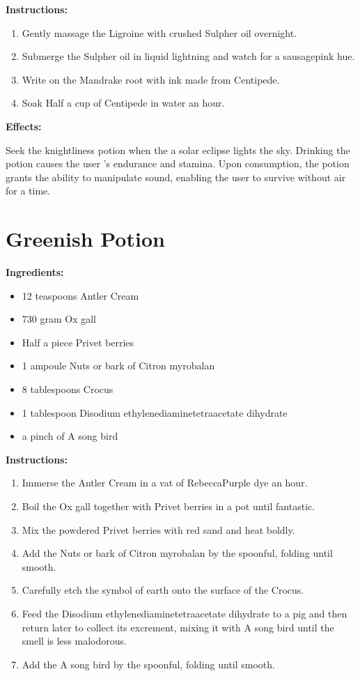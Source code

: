 \documentclass{article}
\begin{document}
\textbf{Instructions:}

\begin{enumerate}
  \item Gently massage the Ligroine with crushed Sulpher oil overnight.
  \item Submerge the Sulpher oil in liquid lightning and watch for a sausagepink hue.
  \item Write on the Mandrake root with ink made from Centipede.
  \item Soak Half a cup of Centipede in water an hour.
\end{enumerate}

\textbf{Effects:}

Seek the knightliness potion when the a solar eclipse lights the sky. Drinking the potion causes the user 's endurance and stamina. Upon consumption, the potion grants the ability to manipulate sound, enabling the user to survive without air for a time.

\newpage
\section*{Greenish Potion}

\textbf{Ingredients:}

\begin{itemize}
  \item 12 teaspoons Antler Cream
  \item 730 gram Ox gall
  \item Half a piece Privet berries
  \item 1 ampoule Nuts or bark of Citron myrobalan
  \item 8 tablespoons Crocus
  \item 1 tablespoon Disodium ethylenediaminetetraacetate dihydrate
  \item a pinch of A song bird
\end{itemize}

\textbf{Instructions:}

\begin{enumerate}
  \item Immerse the Antler Cream in a vat of RebeccaPurple dye an hour.
  \item Boil the Ox gall together with Privet berries in a pot until fantastic.
  \item Mix the powdered Privet berries with red sand and heat boldly.
  \item Add the Nuts or bark of Citron myrobalan by the spoonful, folding until smooth.
  \item Carefully etch the symbol of earth onto the surface of the Crocus.
  \item Feed the Disodium ethylenediaminetetraacetate dihydrate to a pig and then return later to collect its excrement, mixing it with A song bird until the smell is less malodorous.
  \item Add the A song bird by the spoonful, folding until smooth.
\end{enumerate}
\end{document}
